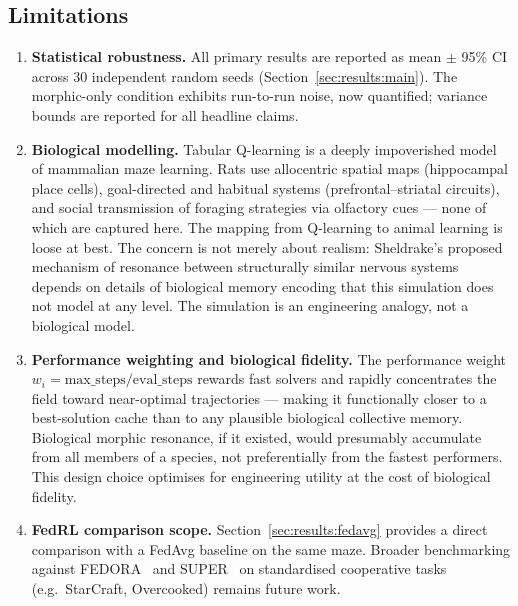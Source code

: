 \documentclass[twoside,11pt]{article}
\begin{document}
\subsection{Limitations}
\label{sec:discussion:limitations}

\begin{enumerate}[leftmargin=2em]
    \item \textbf{Statistical robustness.}  All primary results are reported as
          mean $\pm$ 95\% CI across 30 independent random seeds
          (Section~\ref{sec:results:main}).  The morphic-only condition
          exhibits run-to-run noise, now quantified; variance bounds are
          reported for all headline claims.

    \item \textbf{Biological modelling.}  Tabular Q-learning is a deeply
          impoverished model of mammalian maze learning.  Rats use allocentric
          spatial maps (hippocampal place cells), goal-directed and habitual
          systems (prefrontal--striatal circuits), and social transmission of
          foraging strategies via olfactory cues --- none of which are
          captured here.  The mapping from Q-learning to animal learning is
          loose at best.  The concern is not merely about realism: Sheldrake's
          proposed mechanism of resonance between structurally similar nervous
          systems depends on details of biological memory encoding that this
          simulation does not model at any level.  The simulation is an
          engineering analogy, not a biological model.

    \item \textbf{Performance weighting and biological fidelity.}
          The performance weight $w_i = \text{max\_steps}/\text{eval\_steps}$
          rewards fast solvers and rapidly concentrates the field toward
          near-optimal trajectories --- making it functionally closer to a
          best-solution cache than to any plausible biological collective
          memory.  Biological morphic resonance, if it existed, would
          presumably accumulate from all members of a species, not
          preferentially from the fastest performers.  This design choice
          optimises for engineering utility at the cost of biological fidelity.

    \item \textbf{FedRL comparison scope.}  Section~\ref{sec:results:fedavg}
          provides a direct comparison with a FedAvg baseline on the same
          maze.  Broader benchmarking against FEDORA~\citep{che2023} and
          SUPER~\citep{gerstgrasser2023} on standardised cooperative tasks
          (e.g.\ StarCraft, Overcooked) remains future work.


\end{enumerate}
\end{document}
